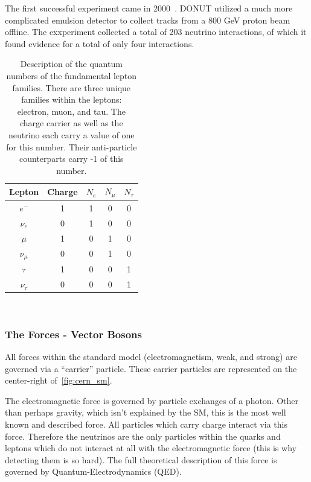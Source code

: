 The first successful experiment came in 2000~\citep{tau_neutrino_discovery_KODAMA2001218}.
DONUT utilized a much more complicated emulsion detector to collect tracks from a 800 GeV proton beam offline.
The exxperiment collected a total of 203 neutrino interactions, of which it found evidence for a total of only four interactions.

\begin{table}
\begin{center}
\begin{tabular}{||c c c c c||}
 \hline
 Lepton & Charge & $N_{e}$ & $N_{\mu}$ & $N_{\tau}$ \\ [0.5ex]
 \hline\hline
 $e^{-}$ & 1 & 1 & 0 & 0 \\
 \hline
 $\nu_{e}$ & 0 & 1 & 0 & 0 \\
 \hline
 $\mu$ & 1 & 0 & 1 & 0 \\
 \hline
 $\nu_{\mu}$ & 0 & 0 & 1 & 0 \\
 \hline
 $\tau$ & 1 & 0 & 0 & 1 \\
 \hline
 $\nu_{\tau}$ & 0 & 0 & 0 & 1 \\
 \hline
\end{tabular}
\caption{Description of the quantum numbers of the fundamental lepton families.
  There are three unique families within the leptons: electron, muon, and tau.
  The charge carrier as well as the neutrino each carry a value of one for this number.
  Their anti-particle counterparts carry -1 of this number.}
\end{center}
\end{table}
~\label{table:lepton_qn}

\subsubsection{The Forces - Vector Bosons}

All forces within the standard model (electromagnetism, weak, and strong) are governed via a ``carrier'' particle.
These carrier particles are represented on the center-right of~\ref{fig:cern_sm}.

The electromagnetic force is governed by particle exchanges of a photon.
Other than perhaps gravity, which isn't explained by the SM, this is the most well known and described force.
All particles which carry charge  interact via this force.
Therefore the neutrinos are the only particles within the quarks and leptons which do not interact at all with the electromagnetic force (this is why detecting them is so hard).
The full theoretical description of this force is governed by Quantum-Electrodynamics (QED).

